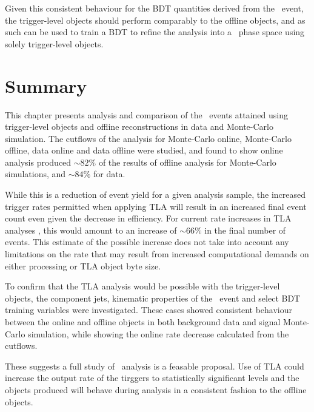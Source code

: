 	Given this consistent behaviour for the BDT quantities derived from the \VBFHBB\ event, the trigger-level objects should perform comparably to the offline objects, and as such can be used to train a BDT to refine the analysis into a \VBFHBB\ phase space using solely trigger-level objects.

	\section{Summary}

	This chapter presents analysis and comparison of the \VBFHBB\ events attained using trigger-level objects and offline reconstructions in data and Monte-Carlo simulation. The cutflows of the analysis for Monte-Carlo online, Monte-Carlo offline, data online and data offline were studied, and found to show online analysis produced $\sim82\%$ of the results of offline analysis for Monte-Carlo simulations, and $\sim84\%$ for data.

	While this is a reduction of event yield for a given analysis sample, the increased trigger rates permitted when applying TLA will result in an increased final event count even given the decrease in efficiency. For current rate increases in TLA analyses \cite{tla}, this would amount to an increase of $\sim66\%$ in the final number of events. This estimate of the possible increase does not take into account any limitations on the rate that may result from increased computational demands on either processing or TLA object byte size.

	To confirm that the TLA analysis would be possible with the trigger-level objects, the component jets, kinematic properties of the \VBFHBB\ event and select BDT training variables were investigated. These cases showed consistent behaviour between the online and offline objects in both background data and signal Monte-Carlo simulation, while showing the online rate decrease calculated from the cutflows.

	These suggests a full study of \VBFHBB\ analysis is a feasable proposal. Use of TLA could increase the output rate of the tirggers to statistically significant levels and the objects produced will behave during analysis in a consistent fashion to the offline objects.
\endinput
